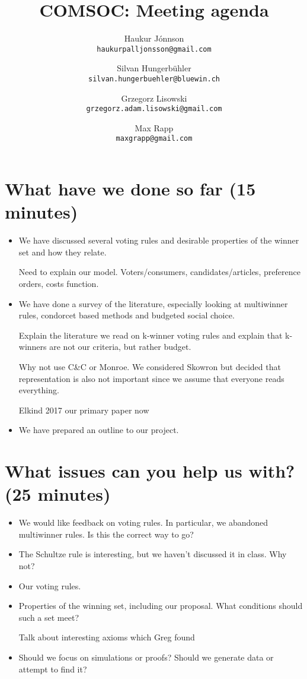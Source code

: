 \documentclass[10pt,a4paper, english]{article}
\author{
    Haukur J{\'o}nnson\\    \texttt{haukurpalljonsson@gmail.com}
    \and
    Silvan Hungerb{\"u}hler\\   \texttt{silvan.hungerbuehler@bluewin.ch}
    \and
    Grzegorz Lisowski\\  \texttt{grzegorz.adam.lisowski@gmail.com}
    \and
    Max Rapp\\  \texttt{maxgrapp@gmail.com}
}
\title{%
  COMSOC: Meeting agenda}
\date{}
\begin{document}
\maketitle

\section{What have we done so far (15 minutes)}
\begin{itemize}
\item We have discussed several voting rules and desirable properties of the winner set and how they relate.

Need to explain our model. Voters/consumers, candidates/articles, preference orders, costs function.

\item We have done a survey of the literature, especially looking at multiwinner rules, condorcet based methods and budgeted social choice.

Explain the literature we read on k-winner voting rules and explain that k-winners are not our criteria, but rather budget.

Why not use C\&C or Monroe. We considered Skowron but decided that representation is also not important since we assume that everyone reads everything.

Elkind 2017 our primary paper now

\item We have prepared an outline to our project.
\end{itemize}

\section{What issues can you help us with? (25 minutes)}
\begin{itemize}
\item We would like feedback on voting rules. In particular, we abandoned multiwinner rules. Is this the correct way to go?
\item The Schultze rule is interesting, but we haven't discussed it in class. Why not?
\item Our voting rules.
\item Properties of the winning set, including our proposal. What conditions should such a set meet?

Talk about interesting axioms which Greg found

\item Should we focus on simulations or proofs? Should we generate data or attempt to find it?

\end{itemize}
\end{document}
